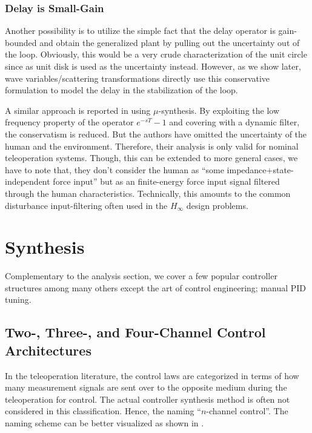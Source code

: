 \subsubsection{Delay is Small-Gain}
Another possibility is to utilize the simple fact that the delay operator is gain-bounded and obtain the 
generalized plant by pulling out the uncertainty out of the loop. Obviously, this would be a very crude
characterization of the unit circle since as unit disk is used as the uncertainty instead. However, as 
we show later, wave variables/scattering transformations directly use this conservative formulation to 
model the delay in the stabilization of the loop.

A similar approach is reported in \cite{leungfa} using $\mu$-synthesis. By exploiting the
low frequency property of the operator $e^{-sT}-1$ and covering with a dynamic filter, the conservatism
is reduced. But the authors have omitted the uncertainty of the human and the environment. Therefore, 
their analysis is only valid for nominal teleoperation systems. Though, this can be extended to more 
general cases, we have to note that, they don't consider the human as \enquote{some impedance$+$state-independent 
force input} but as an finite-energy force input signal filtered through the human characteristics. 
Technically, this amounts to the common disturbance input-filtering often used in the $H_\infty$ design problems. 

 




\section{Synthesis}

Complementary to the analysis section, we cover a few popular controller structures among many others except the 
art of control engineering; manual PID tuning. 

\subsection{Two-, Three-, and Four-Channel Control Architectures}
In the teleoperation literature, the control laws are categorized in terms of how many measurement signals 
are sent over to the opposite medium during the teleoperation for control. The actual controller synthesis 
method is often not considered in this classification.  Hence, the naming \enquote{$n$-channel control}. The naming 
scheme can be better visualized as shown in . 


